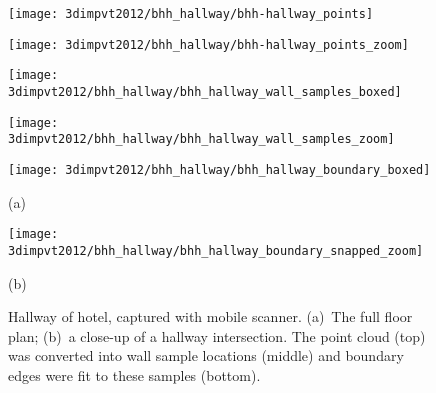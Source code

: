 \documentclass[12pt,onecolumn,oneside]{book}
\begin{document}
\begin{figure}

\centering
\begin{minipage}[b]{0.335\linewidth}
  \centering
  \centerline{\texttt{[image: 3dimpvt2012/bhh\_hallway/bhh-hallway\_points]}}
\end{minipage}
\begin{minipage}[b]{0.3\linewidth}
  \centering
  \centerline{\texttt{[image: 3dimpvt2012/bhh\_hallway/bhh-hallway\_points\_zoom]}}
\end{minipage}
\linebreak 
\linebreak 

\begin{minipage}[b]{0.3\linewidth}
  \centering
  \centerline{\texttt{[image: 3dimpvt2012/bhh\_hallway/bhh\_hallway\_wall\_samples\_boxed]}}
\end{minipage}
\begin{minipage}[b]{0.3\linewidth}
  \centering
  \centerline{\texttt{[image: 3dimpvt2012/bhh\_hallway/bhh\_hallway\_wall\_samples\_zoom]}}
\end{minipage}
\linebreak
\linebreak 

\begin{minipage}[b]{0.3\linewidth}
  \centering
  \centerline{\texttt{[image: 3dimpvt2012/bhh\_hallway/bhh\_hallway\_boundary\_boxed]}}
  \centerline{(a)}
\end{minipage}
\begin{minipage}[b]{0.3\linewidth}
  \centering
  \centerline{\texttt{[image: 3dimpvt2012/bhh\_hallway/bhh\_hallway\_boundary\_snapped\_zoom]}}
  \centerline{(b)}
\end{minipage}
\linebreak 
\linebreak 

\caption[Hallway of hotel, captured with a mobile scanner.]{Hallway of hotel, captured with mobile scanner.  (a)~The full floor plan; (b)~a close-up of a hallway intersection.  The point cloud (top) was converted into wall sample locations (middle) and boundary edges were fit to these samples (bottom).}
\label{fig:bhh_hallway_results}

\end{figure}

\end{document}
